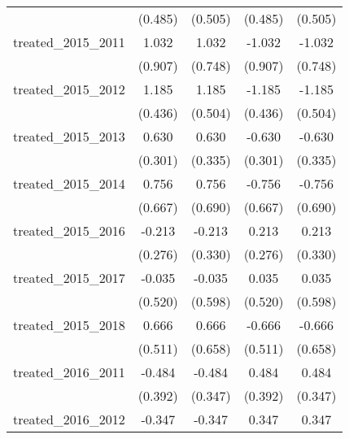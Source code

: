 {\begin{tabular}{l*{4}{c}}
            &     (0.485)         &     (0.505)         &     (0.485)         &     (0.505)         \\
[1em]
treated\_2015\_2011&       1.032         &       1.032         &      -1.032         &      -1.032         \\
            &     (0.907)         &     (0.748)         &     (0.907)         &     (0.748)         \\
[1em]
treated\_2015\_2012&       1.185\sym{**} &       1.185\sym{*}  &      -1.185\sym{**} &      -1.185\sym{*}  \\
            &     (0.436)         &     (0.504)         &     (0.436)         &     (0.504)         \\
[1em]
treated\_2015\_2013&       0.630\sym{*}  &       0.630         &      -0.630\sym{*}  &      -0.630         \\
            &     (0.301)         &     (0.335)         &     (0.301)         &     (0.335)         \\
[1em]
treated\_2015\_2014&       0.756         &       0.756         &      -0.756         &      -0.756         \\
            &     (0.667)         &     (0.690)         &     (0.667)         &     (0.690)         \\
[1em]
treated\_2015\_2016&      -0.213         &      -0.213         &       0.213         &       0.213         \\
            &     (0.276)         &     (0.330)         &     (0.276)         &     (0.330)         \\
[1em]
treated\_2015\_2017&      -0.035         &      -0.035         &       0.035         &       0.035         \\
            &     (0.520)         &     (0.598)         &     (0.520)         &     (0.598)         \\
[1em]
treated\_2015\_2018&       0.666         &       0.666         &      -0.666         &      -0.666         \\
            &     (0.511)         &     (0.658)         &     (0.511)         &     (0.658)         \\
[1em]
treated\_2016\_2011&      -0.484         &      -0.484         &       0.484         &       0.484         \\
            &     (0.392)         &     (0.347)         &     (0.392)         &     (0.347)         \\
[1em]
treated\_2016\_2012&      -0.347         &      -0.347         &       0.347         &       0.347         \\

\end{tabular}}

